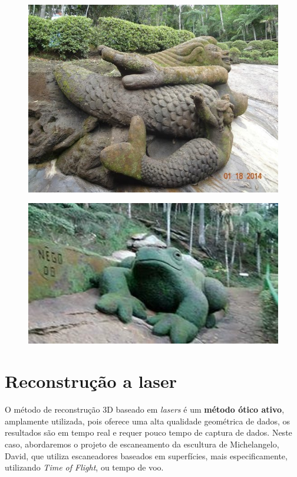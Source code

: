 \documentclass[table, usenames, svgnames, xcolor=dvipsnames]{beamer}
\begin{document}
\begin{frame} 
	\begin{figure}[!h]
		\centering
		\includegraphics[width=0.7\linewidth]{figs/jardim-do-nego22.jpg}
	\end{figure}
\end{frame}


\begin{frame} 
	\begin{figure}[!h]
		\centering
		\includegraphics[width=0.7\linewidth]{figs/jardim-do-nego32.jpg}
	\end{figure}
\end{frame}


\section{Reconstrução a laser}

\begin{frame} 
	\begin{center}
    O método de reconstrução 3D baseado em \emph{lasers} é um \textbf{método ótico ativo}, amplamente utilizada, pois oferece uma alta qualidade geométrica de dados, os resultados são em tempo real e requer pouco tempo de captura de dados.
Neste caso, abordaremos o projeto de escaneamento da escultura de Michelangelo, David, que utiliza escaneadores baseados em superfícies, mais especificamente, utilizando \emph{Time of Flight}, ou tempo de voo.
	\end{center}
\end{frame}
\end{document}
